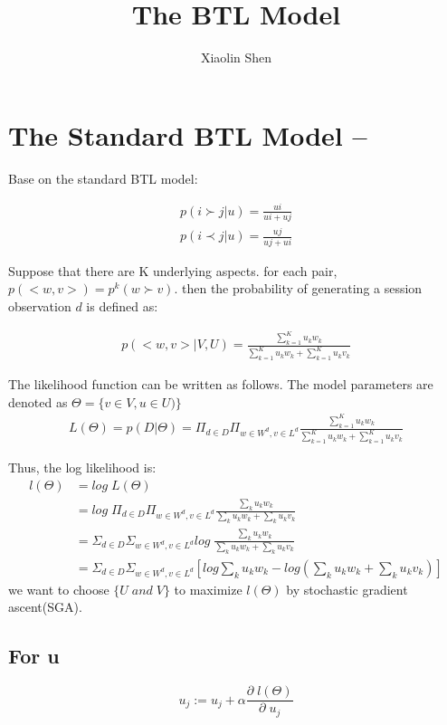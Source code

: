 \documentclass{article}
\title{The BTL Model}
\author{Xiaolin Shen}
\begin{document}
\maketitle


\section{The Standard BTL Model --}
Base on the standard BTL model:

\begin{align*}
	p(i \succ j |u)=\frac{ui}{ui+ uj} \\
	p(i \prec j |u)=\frac{uj}{uj+ ui}
\end{align*}

 Suppose that there are K underlying aspects. for each pair, $p(<w,v>) = p^k(w\succ v) $. then the probability of generating a session observation $d$ is defined as:

\begin{align}
p(<w,v>|V,U)
= \frac{\sum_{k=1}^{K} u_k w_k}{\sum_{k=1}^{K} u_k w_k+ \sum_{k=1}^{K} u_k v_k}
\end{align}

The likelihood function can be written as follows. The model parameters are denoted as $ \Theta = \{ v \in V ,u \in U ) \}$
\begin{align}
L(\Theta)=p(D|\Theta)
=\Pi_{d \in D} \Pi_{w\in W^d, v\in L^d} \frac{\sum_{k=1}^{K} u_k w_k}{\sum_{k=1}^{K} u_k w_k+ \sum_{k=1}^{K} u_k v_k}
\end{align}

Thus, the log likelihood is:
\begin{align}
l(\Theta) &= log \; L(\Theta) \\
& =log \; \Pi_{d \in D} \Pi_{w\in W^d, v\in L^d} \frac{\sum_k u_k w_k}{\sum_k u_k w_k+ \sum_k u_k v_k}\\ \nonumber
& =\Sigma_{d \in D} \Sigma_{w\in W^d, v\in L^d} log \;  \frac{\sum_k u_k w_k}{\sum_k u_k w_k+ \sum_k u_k v_k}\\ \nonumber
& =\Sigma_{d \in D} \Sigma_{w\in W^d, v\in L^d} [log \sum_k u_k w_k-log (\sum_k u_k w_k+ \sum_k u_k v_k)]
\end{align}
 we want to choose $\{ U \; and \; V\}$ to maximize $ l(\Theta) $ by stochastic gradient ascent(SGA).

\subsection{For u}
$$u_j:= u_j + \alpha \frac{\partial \;l(\Theta) }{\partial \;u_j}$$
\end{document}
